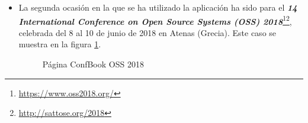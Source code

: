 \documentclass[a4paper, 12pt]{book}
\begin{document}
\begin{itemize}
\item La segunda ocasión en la que se ha utilizado la aplicación ha sido para el \textbf{\textit{14 International Conference on Open Source Systems (OSS) 2018}}\footnote{\url{https://www.oss2018.org/}}\footnote{\url{http://sattose.org/2018}}, celebrada del 8 al 10 de junio de 2018 en Atenas (Grecia). Este caso se muestra en la figura \ref{fig:imgOSS}.
\begin{figure}[h!]
	\centering
	\caption{Página ConfBook OSS 2018}
	\label{fig:imgOSS}
\end{figure}


\end{itemize}
\end{document}
